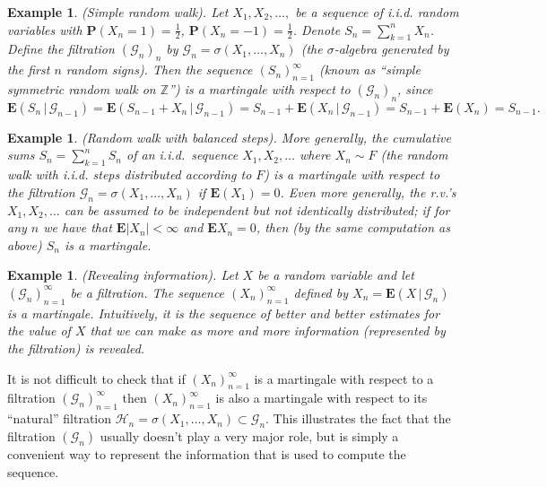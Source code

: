 \documentclass[12pt]{article}
\newcommand{\Z}{\mathbb{Z}}
\newcommand{\prob}{\mathbf{P}}
\newcommand{\expec}{\mathbf{E}}
\newcommand{\condexp}[2]{\expec\left(#1\,|\,#2\right)}
\theoremstyle{example}
\newtheorem{example}[thm]{Example}
\begin{document}
\begin{example} (Simple random walk).
Let $X_1, X_2, \ldots, $ be a sequence of i.i.d. random variables with $\prob(X_n=1)=\tfrac12$, $\prob(X_n=-1)=\tfrac12$. Denote $S_n = \sum_{k=1}^n X_n$. Define the filtration $(\mathcal{G}_n)_n$ by $\mathcal{G}_n = \sigma(X_1,\ldots,X_n)$ (the $\sigma$-algebra generated by the first $n$ random signs). Then the sequence $(S_n)_{n=1}^\infty$ (known as ``simple symmetric random walk on $\Z$'') is a martingale with respect to $(\mathcal{G}_n)_n$, since
$$ \condexp{S_n}{\mathcal{G}_{n-1}} = \condexp{S_{n-1}+X_n}{\mathcal{G}_{n-1}}
= S_{n-1} + \condexp{X_n}{\mathcal{G}_{n-1}} = S_{n-1} + \expec(X_n) = S_{n-1}.
$$
\end{example}

\begin{example} (Random walk with balanced steps).
More generally, the cumulative sums $S_n=\sum_{k=1}^n S_n$ of an i.i.d.\ sequence $X_1,X_2,\ldots$ where $X_n\sim F$ (the random walk with i.i.d. steps distributed according to $F$) is a martingale with respect to the filtration $\mathcal{G}_n=\sigma(X_1,\ldots,X_n)$ if $\expec(X_1)=0$. Even more generally, the r.v.'s $X_1,X_2,\ldots$ can be assumed to be independent but not identically distributed; if for any $n$ we have that $\expec|X_n|<\infty$ and $\expec X_n = 0$, then (by the same computation as above) $S_n$ is a martingale.
\end{example}

\begin{example} (Revealing information). Let $X$ be a random variable and let $(\mathcal{G}_n)_{n=1}^\infty$ be a filtration. The sequence $(X_n)_{n=1}^\infty$ defined by
$ X_n = \condexp{X}{\mathcal{G}_n} $
is a martingale. Intuitively, it is the sequence of better and better estimates for the value of $X$ that we can make as more and more information (represented by the filtration) is revealed.
\end{example}

It is not difficult to check that if $(X_n)_{n=1}^\infty$ is a martingale with respect to a filtration $(\mathcal{G}_n)_{n=1}^\infty$ then $(X_n)_{n=1}^\infty$ is also a martingale with respect to its ``natural'' filtration $\mathcal{H}_n=\sigma(X_1,\ldots,X_n) \subset \mathcal{G}_n$. This illustrates the fact that the filtration $(\mathcal{G}_n)$ usually doesn't play a very major role, but is simply a convenient way to represent the information that is used to compute the sequence.
\end{document}
